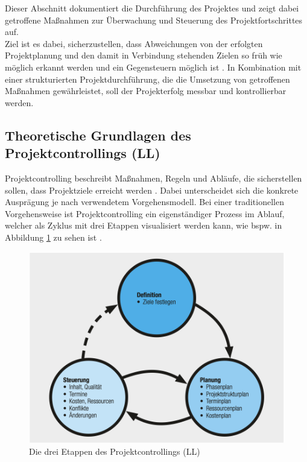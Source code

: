 \documentclass[ThesisDJ.tex]{subfiles}
\begin{document}
    Dieser Abschnitt dokumentiert die Durchführung des Projektes und zeigt dabei getroffene Maßnahmen zur Überwachung und Steuerung des Projektfortschrittes auf.\\
    Ziel ist es dabei, sicherzustellen, dass Abweichungen von der erfolgten Projektplanung und den damit in Verbindung stehenden Zielen so früh wie möglich erkannt 
    werden und ein Gegensteuern möglich ist \cite[S.~55ff]{riedl_management_2019}. In Kombination mit einer strukturierten Projektdurchführung, die die Umsetzung von 
    getroffenen Maßnahmen gewährleistet, soll der Projekterfolg messbar und kontrollierbar werden.

    \subsection{Theoretische Grundlagen des Projektcontrollings (LL)}
    Projektcontrolling beschreibt Maßnahmen, Regeln und Abläufe, die sicherstellen sollen, dass Projektziele
    erreicht werden \cite{kerzner_project_2022} \cite[S.~189]{kuster_handbuch_2022}. Dabei unterscheidet sich die konkrete Ausprägung 
    je nach verwendetem Vorgehensmodell. Bei einer traditionellen Vorgehensweise ist Projektcontrolling ein eigenständiger Prozess im Ablauf, welcher
    als Zyklus mit drei Etappen visualisiert werden kann, wie bspw. in Abbildung \ref{fig:controlling} zu sehen ist \cite[S.~191]{kuster_handbuch_2022}.

    \begin{figure}
        \includegraphics[scale=0.8]{controlling.png}
        \centering
        \caption{Die drei Etappen des Projektcontrollings (LL)}
        \label{fig:controlling}
    \end{figure}
\end{document}
